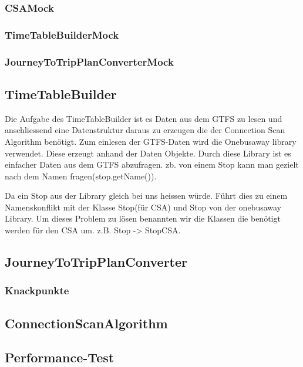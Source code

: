 \subsubsection{CSAMock}

\subsubsection{TimeTableBuilderMock}

\subsubsection{JourneyToTripPlanConverterMock}

\subsection{TimeTableBuilder}
Die Aufgabe des TimeTableBuilder ist es Daten aus dem GTFS zu lesen und anschliessend eine Datenstruktur daraus zu erzeugen die der Connection Scan Algorithm benötigt. Zum einlesen der GTFS-Daten wird die Onebusaway library verwendet. Diese erzeugt anhand der Daten Objekte. Durch diese Library ist es einfacher Daten aus dem GTFS abzufragen. zb. von einem Stop kann man gezielt nach dem Namen fragen(stop.getName()).  

Da ein Stop aus der Library gleich bei uns heissen würde. Führt dies zu einem Namenskonflikt mit der Klasse Stop(für CSA) und Stop von der onebusaway Library. Um dieses Problem zu lösen benannten wir die Klassen die benötigt werden für den CSA um. z.B. Stop -> StopCSA. 



\subsection{JourneyToTripPlanConverter}
\subsubsection{Knackpunkte}

\subsection{ConnectionScanAlgorithm}

\subsection{Performance-Test}




